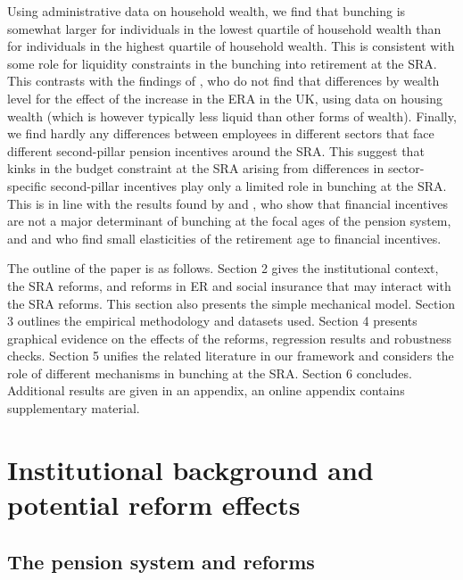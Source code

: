 \documentclass[12pt,a4paper]{article}
\begin{document}
Using administrative data on household wealth, we find that bunching is somewhat larger for individuals in the lowest quartile of household wealth than for individuals in the highest quartile of household wealth. This is consistent with some role for liquidity constraints in the bunching into retirement at the SRA. This contrasts with the findings of \cite{cribb2016signals}, who do not find that differences by wealth level for the effect of the increase in the ERA in the UK, using data on housing wealth (which is however typically less liquid than other forms of wealth).  
Finally, we find hardly any differences between employees in different sectors that face different second-pillar pension incentives around the SRA. This suggest that kinks in the budget constraint at the SRA arising from differences in sector-specific second-pillar incentives play only a limited role in bunching at the SRA. This is in line with the results found by \cite{behaghel_framing_2012} and \cite{seibold2019reference}, who show that financial incentives are not a major determinant of bunching at the focal ages of the pension system, and \cite{Brown2013} and \cite{manoli2016nonparametric} who find small elasticities of the retirement age to financial incentives. 

The outline of the paper is as follows. Section 2 gives the institutional context, the SRA reforms, and reforms in ER and social insurance that may interact with the SRA reforms. This section also presents the simple mechanical model. Section 3 outlines the empirical methodology and datasets used. Section 4 presents graphical evidence on the effects of the reforms, regression results and robustness checks. Section 5 unifies the related literature in our framework and considers the role of different mechanisms in bunching at the SRA. Section 6 concludes. Additional results are given in an appendix, an online appendix contains supplementary material.

\section{Institutional background and potential reform effects}\label{institutions}

\subsection{The pension system and reforms}
\end{document}
